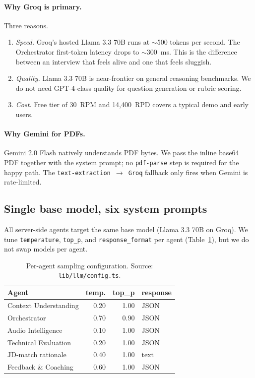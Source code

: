 \documentclass[11pt,a4paper]{article}
\begin{document}
\paragraph{Why Groq is primary.} Three reasons.
\begin{enumerate}
  \item \emph{Speed.} Groq's hosted Llama 3.3 70B runs at $\sim$500 tokens
        per second. The Orchestrator first-token latency drops to
        $\sim$300~ms. This is the difference between an interview that
        feels alive and one that feels sluggish.
  \item \emph{Quality.} Llama 3.3 70B is near-frontier on general reasoning
        benchmarks. We do not need GPT-4-class quality for question
        generation or rubric scoring.
  \item \emph{Cost.} Free tier of 30~RPM and 14{,}400~RPD covers a typical
        demo and early users.
\end{enumerate}

\paragraph{Why Gemini for PDFs.} Gemini 2.0 Flash natively understands PDF
bytes. We pass the inline base64 PDF together with the system prompt; no
\texttt{pdf-parse} step is required for the happy path. The
\texttt{text-extraction $\rightarrow$ Groq} fallback only fires when
Gemini is rate-limited.

\subsection{Single base model, six system prompts}

All server-side agents target the same base model
(Llama 3.3 70B on Groq). We tune \texttt{temperature}, \texttt{top\_p},
and \texttt{response\_format} per agent (Table~\ref{tab:per-agent}), but
we do not swap models per agent.

\begin{table}[h]
\centering
\renewcommand{\arraystretch}{1.25}
\begin{tabular}{@{}lrrl@{}}
\toprule
\textbf{Agent} & \textbf{temp.} & \textbf{top\_p} & \textbf{response} \\
\midrule
Context Understanding   & 0.20 & 1.00 & JSON  \\
Orchestrator            & 0.70 & 0.90 & JSON  \\
Audio Intelligence      & 0.10 & 1.00 & JSON  \\
Technical Evaluation    & 0.20 & 1.00 & JSON  \\
JD-match rationale      & 0.40 & 1.00 & text  \\
Feedback \& Coaching    & 0.60 & 1.00 & JSON  \\
\bottomrule
\end{tabular}
\caption{Per-agent sampling configuration. Source:
\texttt{lib/llm/config.ts}.}\label{tab:per-agent}
\end{table}
\end{document}

